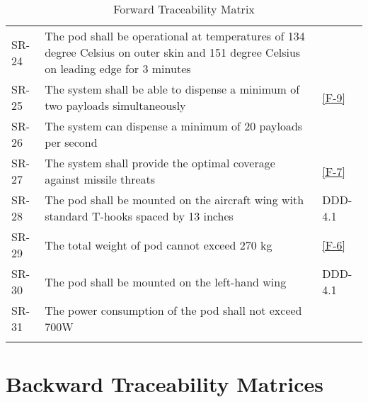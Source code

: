 \documentclass[Main]{subfiles}
\begin{document}
\begin{longtable}{p{} p{} p{}}
SR-24 &  The pod shall be operational at temperatures of 134 degree Celsius on outer skin and 151 degree Celsius on leading edge for 3 minutes &  \\

SR-25 & The system shall be able to dispense a minimum of two payloads simultaneously  & \ref{F-9} \\

SR-26 & The system can dispense a minimum of 20 payloads per second &  \\

SR-27 & The system shall provide the optimal coverage against	missile threats & \ref{F-7} \\

SR-28 & The pod shall be mounted on the aircraft wing with standard T-hooks spaced by 13 inches & DDD-4.1 \\

SR-29 & The total weight of pod cannot exceed 270 kg  & \ref{F-6} \\

SR-30 & The pod shall be mounted on the left-hand wing & DDD-4.1 \\

SR-31 & The power consumption of the pod shall not exceed 700W &  \\\hline

\caption{Forward Traceability Matrix}
\label{Tab:Forward}
\end{longtable}






\newpage
\section{Backward Traceability Matrices}
\end{document}
